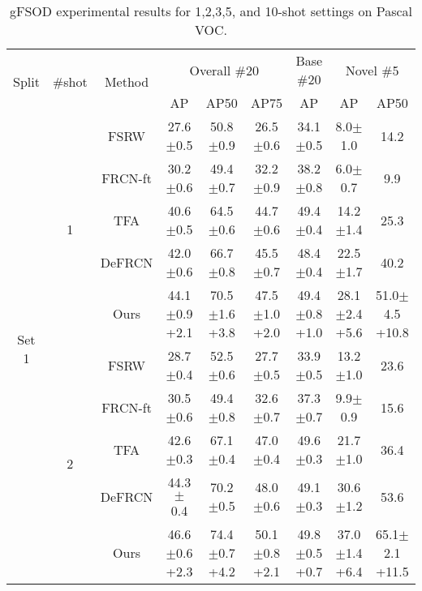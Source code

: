 \documentclass{article}
\begin{document}
\begin{table}[hbt!]
    \caption{gFSOD experimental results for 1,2,3,5, and 10-shot settings on Pascal VOC.}

    \centering
    \begin{adjustbox}{width=0.79\textwidth}
        {
    \begin{tabular}{c|c|c|ccc|c|cc}
        \toprule
         \multirow{2}{*}{Split}&\multirow{2}{*}{\#shot}&\multirow{2}{*}{Method}&\multicolumn{3}{c|}{Overall \#20} & \multicolumn{1}{c|}{Base \#20} & \multicolumn{2}{c}{Novel \#5}  \\
         &&&AP&AP50&AP75&AP&AP&AP50 \\
         \hline
         \multirow{25}{*}{ Set 1}&\multirow{5}{*}{1}&FSRW \cite{metayolo} &27.6$\pm$0.5&50.8$\pm$0.9&26.5$\pm$0.6&34.1$\pm$0.5&8.0$\pm$1.0&14.2  \\
         &&FRCN-ft \cite{metarcnn}&30.2$\pm$0.6&49.4$\pm$0.7&32.2$\pm$0.9&38.2$\pm$0.8&6.0$\pm$0.7&9.9\\
         &&TFA \cite{tfa}&40.6$\pm$0.5&64.5$\pm$0.6&44.7$\pm$0.6&49.4$\pm$0.4&14.2$\pm$1.4&25.3\\
         && DeFRCN \cite{defrcn}&42.0$\pm$0.6&66.7$\pm$0.8&45.5$\pm$0.7&48.4$\pm$0.4&22.5$\pm$1.7&40.2\\
         && \cellcolor{gray!30}Ours&\cellcolor{gray!30}44.1$\pm$0.9 {\scriptsize \color{red}+2.1}&\cellcolor{gray!30}70.5$\pm$1.6 {\scriptsize \color{red}+3.8}&\cellcolor{gray!30}47.5$\pm$1.0 {\scriptsize \color{red}+2.0}&\cellcolor{gray!30} 49.4$\pm$0.8 {\scriptsize \color{red}+1.0}&\cellcolor{gray!30} 28.1$\pm$2.4 {\scriptsize \color{red}+5.6}&\cellcolor{gray!30} 51.0$\pm$4.5 {\scriptsize \color{red}+10.8}\\
         \cmidrule{2-9}
         &\multirow{5}{*}{2}&FSRW \cite{metayolo} & 28.7$\pm$0.4 & 52.5$\pm$0.6& 27.7$\pm$0.5& 33.9 $\pm$0.5&13.2$\pm$1.0&23.6 \\
         &&FRCN-ft \cite{metarcnn}&30.5$\pm$0.6&49.4$\pm$0.8&32.6$\pm$0.7&37.3$\pm$0.7&9.9$\pm$0.9&15.6\\
         &&TFA \cite{tfa}&42.6$\pm$0.3&67.1$\pm$0.4&47.0$\pm$0.4&49.6$\pm$0.3&21.7$\pm$1.0&36.4\\
         &&DeFRCN \cite{defrcn}&44.3$\pm$ 0.4&70.2$\pm$0.5&48.0$\pm$0.6&49.1$\pm$0.3&30.6$\pm$1.2&53.6\\
         && \cellcolor{gray!30}Ours&\cellcolor{gray!30}46.6$\pm$0.6 {\scriptsize \color{red}+2.3}&\cellcolor{gray!30}74.4$\pm$0.7 {\scriptsize \color{red}+4.2}&\cellcolor{gray!30}50.1$\pm$0.8 {\scriptsize \color{red}+2.1}&\cellcolor{gray!30}49.8$\pm$0.5 {\scriptsize \color{red}+0.7}&\cellcolor{gray!30}37.0$\pm$1.4 {\scriptsize \color{red}+6.4}&\cellcolor{gray!30}65.1$\pm$2.1 {\scriptsize \color{red}+11.5}\\

\end{tabular}}
\end{adjustbox}
\end{table}
\end{document}

